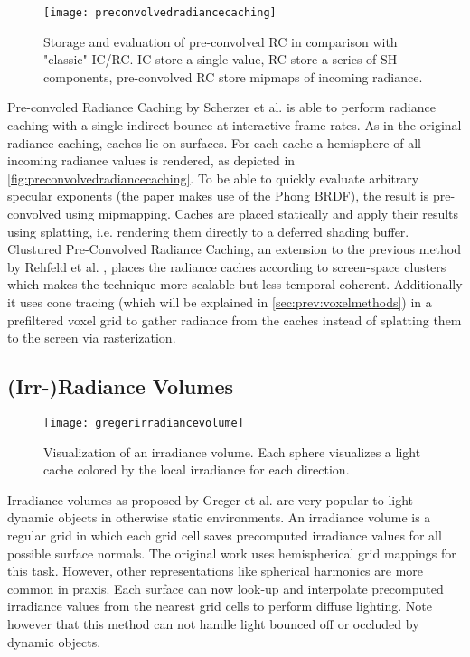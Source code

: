 \documentclass[thesis.tex]{subfiles}
\begin{document}
\begin{figure}[h]
	\centering
	\texttt{[image: preconvolvedradiancecaching]}
	\caption{\cite{bib:preconvoledradiancecaching} Storage and evaluation of pre-convolved RC in comparison with "classic" IC/RC.
	IC store a single value,
	RC store a series of SH components,
	pre-convolved RC store mipmaps of incoming radiance.} \label{fig:preconvolvedradiancecaching}
\end{figure}
Pre-convoled Radiance Caching by Scherzer et al. \cite{bib:preconvoledradiancecaching} is able to perform radiance caching with a single indirect bounce at interactive frame-rates.
As in the original radiance caching, caches lie on surfaces.
For each cache a hemisphere of all incoming radiance values is rendered, as depicted in \autoref{fig:preconvolvedradiancecaching}.
To be able to quickly evaluate arbitrary specular exponents (the paper makes use of the Phong BRDF), the result is pre-convolved using mipmapping.
Caches are placed statically and apply their results using splatting, i.e. rendering them directly to a deferred shading buffer.
Clustured Pre-Convolved Radiance Caching, an extension to the previous method by Rehfeld et al. \cite{bib:clusteredpreconvoledradiancecaching}, places the radiance caches according to screen-space clusters which makes the technique more scalable but less temporal coherent.
Additionally it uses cone tracing (which will be explained in \autoref{sec:prev:voxelmethods}) in a prefiltered voxel grid to gather radiance from the caches instead of splatting them to the screen via rasterization.

\subsection{(Irr-)Radiance Volumes}

\begin{figure}[h]
	\centering
	\texttt{[image: gregerirradiancevolume]}
	\caption{\cite{bib:irradiancevolume} Visualization of an irradiance volume. Each sphere visualizes a light cache colored by the local irradiance for each direction. } \label{fig:irradiancevolume}
\end{figure}
Irradiance volumes as proposed by Greger et al. \cite{bib:irradiancevolume} are very popular to light dynamic objects in otherwise static environments.
An irradiance volume is a regular grid in which each grid cell saves precomputed irradiance values for all possible surface normals.
The original work uses hemispherical grid mappings for this task.
However, other representations like spherical harmonics are more common in praxis.
Each surface can now look-up and interpolate precomputed irradiance values from the nearest grid cells to perform diffuse lighting. 
Note however that this method can not handle light bounced off or occluded by dynamic objects.
\end{document}
